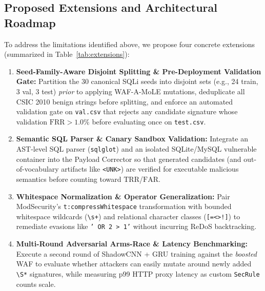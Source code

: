 \documentclass[conference]{IEEEtran}
\newcommand{\TRR}{\ensuremath{\mathrm{TRR}}}
\newcommand{\FAR}{\ensuremath{\mathrm{FAR}}}
\newcommand{\FRR}{\ensuremath{\mathrm{FRR}}}
\begin{document}
\subsection{Proposed Extensions and Architectural Roadmap}
To address the limitations identified above, we propose four concrete extensions (summarized in Table~\ref{tab:extensions}):
\begin{enumerate}
    \item \textbf{Seed-Family-Aware Disjoint Splitting \& Pre-Deployment Validation Gate:} Partition the 30 canonical SQLi seeds into disjoint sets (e.g., 24 train, 3 val, 3 test) \emph{prior} to applying WAF-A-MoLE mutations, deduplicate all CSIC 2010 benign strings before splitting, and enforce an automated validation gate on \texttt{val.csv} that rejects any candidate signature whose validation $\FRR > 1.0\%$ before evaluating once on \texttt{test.csv}.
    \item \textbf{Semantic SQL Parser \& Canary Sandbox Validation:} Integrate an AST-level SQL parser (\texttt{sqlglot}) and an isolated SQLite/MySQL vulnerable container into the Payload Corrector so that generated candidates (and out-of-vocabulary artifacts like \texttt{<UNK>}) are verified for executable malicious semantics before counting toward \TRR{}/\FAR{}.
    \item \textbf{Whitespace Normalization \& Operator Generalization:} Pair ModSecurity's \texttt{t:compressWhitespace} transformation with bounded whitespace wildcards (\texttt{\textbackslash s+}) and relational character classes (\texttt{[=<>!]}) to remediate evasions like \texttt{' OR 2 > 1'} without incurring ReDoS backtracking.
    \item \textbf{Multi-Round Adversarial Arms-Race \& Latency Benchmarking:} Execute a second round of ShadowCNN + GRU training against the \emph{boosted} WAF to evaluate whether attackers can easily mutate around newly added \texttt{\textbackslash S*} signatures, while measuring p99 HTTP proxy latency as custom \texttt{SecRule} counts scale.
\end{enumerate}
\end{document}
